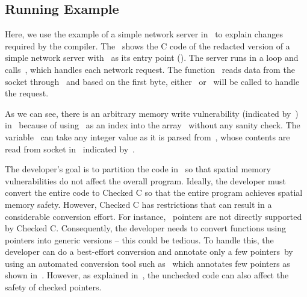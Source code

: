 \subsection{Running Example}
\label{subsec:identifyregionstosbx}
Here,
we use the example of a simple network server in~ to explain changes required by the \systemname compiler.
The~ shows the C code of the redacted version of a simple network server with~ as its entry point (\entrypoint).
The server runs in a loop and calls~, which handles each network request.
The function~ reads data from the socket through~ and based on the first byte, either~ or~ will be called to handle the request.

As we can see, there is an arbitrary memory write vulnerability (indicated by~\realbug) in~ because of using~ as an index into the array~ without any sanity check.
The variable~ can take any integer value as it is parsed from~, whose contents are read from socket in~ indicated by~\rootcause.


The developer's goal is to partition the code in~ so that spatial memory vulnerabilities do not affect the overall program.
Ideally, the developer must convert the entire code to Checked C so that the entire program achieves spatial memory safety.
However, Checked C has restrictions that can result in a considerable conversion effort.
For instance,~ pointers are not directly supported by Checked C.
Consequently, the developer needs to convert functions using~ pointers into generic versions -- this could be tedious.
To handle this, the developer can do a best-effort conversion and annotate only a few pointers~\eg by using an automated conversion tool such as~\threec{} which annotates few pointers as shown in~.
However, as explained in~, the unchecked code can also affect the safety of checked pointers.


